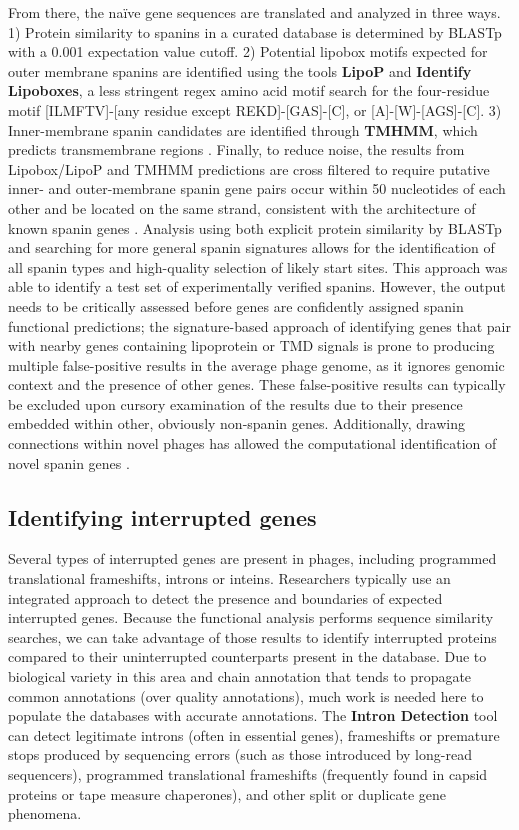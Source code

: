 From there, the naïve gene sequences are translated and analyzed in
three ways. 1) Protein similarity to spanins in a curated database
\cite{Kongari_2018} is determined by BLASTp with a 0.001 expectation value cutoff.
2) Potential lipobox motifs expected for outer membrane spanins are
identified using the tools \textbf{LipoP} \cite{Juncker_2003} and \textbf{Identify
Lipoboxes}, a less stringent regex amino acid motif search for the
four-residue motif {[}ILMFTV{]}-{[}any residue except
REKD{]}-{[}GAS{]}-{[}C{]}, or {[}A{]}-{[}W{]}-{[}AGS{]}-{[}C{]}. 3)
Inner-membrane spanin candidates are identified through \textbf{TMHMM},
which predicts transmembrane regions \cite{Krogh_2001}. Finally, to reduce noise,
the results from Lipobox/LipoP and TMHMM predictions are cross filtered
to require putative inner- and outer-membrane spanin gene pairs occur
within 50 nucleotides of each other and be located on the same strand,
consistent with the architecture of known spanin genes \cite{Kongari_2018}.
Analysis using both explicit protein similarity by BLASTp and searching
for more general spanin signatures allows for the identification of all
spanin types and high-quality selection of likely start sites. This
approach was able to identify a test set of experimentally verified
spanins. However, the output needs to be critically assessed before
genes are confidently assigned spanin functional predictions; the
signature-based approach of identifying genes that pair with nearby
genes containing lipoprotein or TMD signals is prone to producing
multiple false-positive results in the average phage genome, as it
ignores genomic context and the presence of other genes. These
false-positive results can typically be excluded upon cursory
examination of the results due to their presence embedded within other,
obviously non-spanin genes. Additionally, drawing connections within
novel phages has allowed the computational identification of novel
spanin genes \cite{Kongari_2018}.

\subsection*{Identifying interrupted genes}

Several types of interrupted genes are present in phages, including
programmed translational frameshifts, introns or inteins. Researchers
typically use an integrated approach to detect the presence and
boundaries of expected interrupted genes. Because the functional
analysis performs sequence similarity searches, we can take advantage of
those results to identify interrupted proteins compared to their
uninterrupted counterparts present in the database. Due to biological
variety in this area and chain annotation that tends to propagate common
annotations (over quality annotations), much work is needed here to
populate the databases with accurate annotations. The \textbf{Intron
Detection} tool can detect legitimate introns (often in essential
genes), frameshifts or premature stops produced by sequencing errors
(such as those introduced by long-read sequencers), programmed
translational frameshifts (frequently found in capsid proteins or tape
measure chaperones), and other split or duplicate gene phenomena.

